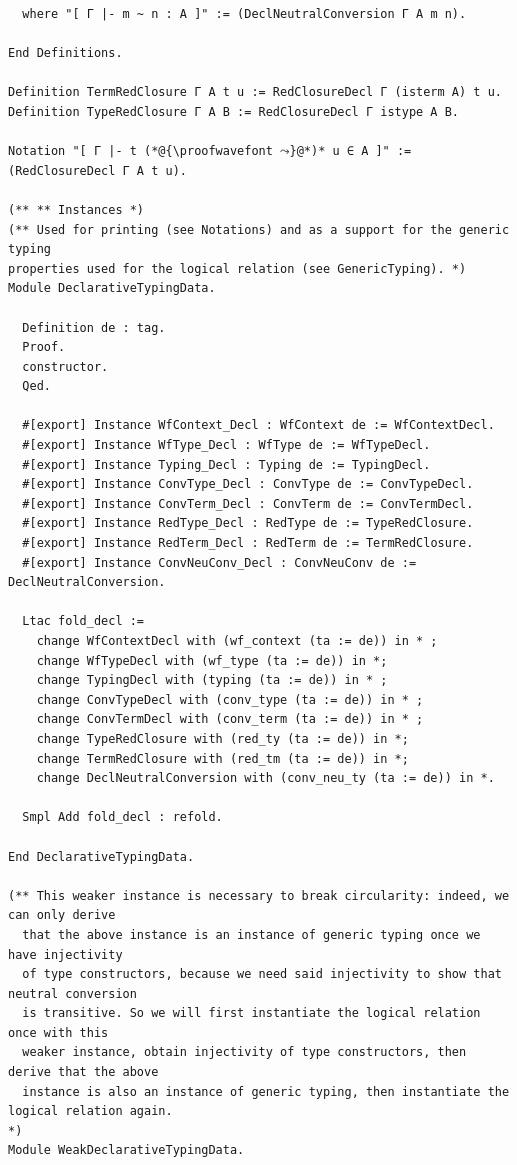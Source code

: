 \documentclass[10pt,a4paper]{amsart}
\begin{document}
\begin{lstlisting}
  where "[ Γ |- m ~ n : A ]" := (DeclNeutralConversion Γ A m n).

End Definitions.

Definition TermRedClosure Γ A t u := RedClosureDecl Γ (isterm A) t u.
Definition TypeRedClosure Γ A B := RedClosureDecl Γ istype A B.

Notation "[ Γ |- t (*@{\proofwavefont ⤳}@*)* u ∈ A ]" := (RedClosureDecl Γ A t u).

(** ** Instances *)
(** Used for printing (see Notations) and as a support for the generic typing
properties used for the logical relation (see GenericTyping). *)
Module DeclarativeTypingData.

  Definition de : tag.
  Proof.
  constructor.
  Qed.

  #[export] Instance WfContext_Decl : WfContext de := WfContextDecl.
  #[export] Instance WfType_Decl : WfType de := WfTypeDecl.
  #[export] Instance Typing_Decl : Typing de := TypingDecl.
  #[export] Instance ConvType_Decl : ConvType de := ConvTypeDecl.
  #[export] Instance ConvTerm_Decl : ConvTerm de := ConvTermDecl.
  #[export] Instance RedType_Decl : RedType de := TypeRedClosure.
  #[export] Instance RedTerm_Decl : RedTerm de := TermRedClosure.
  #[export] Instance ConvNeuConv_Decl : ConvNeuConv de := DeclNeutralConversion.

  Ltac fold_decl :=
    change WfContextDecl with (wf_context (ta := de)) in * ;
    change WfTypeDecl with (wf_type (ta := de)) in *;
    change TypingDecl with (typing (ta := de)) in * ;
    change ConvTypeDecl with (conv_type (ta := de)) in * ;
    change ConvTermDecl with (conv_term (ta := de)) in * ;
    change TypeRedClosure with (red_ty (ta := de)) in *;
    change TermRedClosure with (red_tm (ta := de)) in *;
    change DeclNeutralConversion with (conv_neu_ty (ta := de)) in *.

  Smpl Add fold_decl : refold.

End DeclarativeTypingData.

(** This weaker instance is necessary to break circularity: indeed, we can only derive
  that the above instance is an instance of generic typing once we have injectivity
  of type constructors, because we need said injectivity to show that neutral conversion
  is transitive. So we will first instantiate the logical relation once with this
  weaker instance, obtain injectivity of type constructors, then derive that the above
  instance is also an instance of generic typing, then instantiate the logical relation again.
*)
Module WeakDeclarativeTypingData.


\end{lstlisting}
\end{document}
